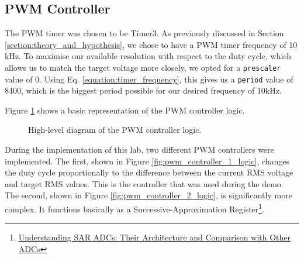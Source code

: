 \subsection{PWM Controller}



The PWM timer was chosen to be Timer3. As previously discussed in Section \ref{section:theory_and_hypothesis}, we chose to have a PWM timer frequency of 10 kHz. To maximise our available resolution with respect to the duty cycle, which allows us to match the target voltage more closely, we opted for a \verb|prescaler| value of 0. Using Eq. \ref{equation:timer_frequency}, this gives us a \verb|period| value of 8400, which is the biggest period possible for our desired frequency of 10kHz.



Figure \ref{fig:pwm_controller_logic} shows a basic representation of the PWM controller logic. 

\begin{figure}[h]
\caption{\label{fig:pwm_controller_logic}High-level diagram of the PWM controller logic.}
\end{figure}


During the implementation of this lab, two different PWM controllers were implemented. The first, shown in Figure \ref{fig:pwm_controller_1_logic}, changes the duty cycle proportionally to the difference between the current RMS voltage and target RMS values. This is the controller that was used during the demo. The second, shown in Figure \ref{fig:pwm_controller_2_logic}, is significantly more complex. It functions basically as a Successive-Approximation Register\footnote{\href{https://www.maximintegrated.com/en/app-notes/index.mvp/id/1080}{Understanding SAR ADCs: Their Architecture and Comparison with Other ADCs}}. 


